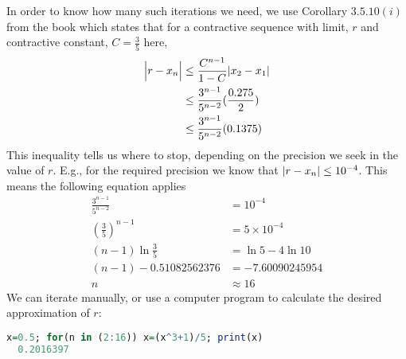 \documentclass[boxes, qed]{homework}
\DeclarePairedDelimiter\abs{\lvert}{\rvert}
\begin{document}
\begin{solution}
  In order to know how many such iterations we need, we use Corollary $3.5.10(i)$
  from the book which states that for a contractive sequence with limit, $r$ and
  contractive constant, $C=\frac{3}{5}$ here,
  \begin{align*}
    \abs[\Big]{r-x_n} 
      &\le \frac{C^{n-1}}{1-C} \abs[Big]{x_2-x_1}\\
      &\le \frac{3^{n-1}}{5^{n-2}} (\frac{0.275}{2})\\
      &\le \frac{3^{n-1}}{5^{n-2}} (0.1375)
  \end{align*}
  This inequality tells  us where to stop, depending on the precision we seek in the value
  of $r$. E.g., for the required precision we know that $\abs{r-x_n} \le 10^{-4}$. 
  This means the following equation applies
  \begin{align*}
    \frac{3^{n-1}}{5^{n-2}} &= 10^{-4}\\
    (\frac{3}{5})^{n-1} &= 5 \times 10^{-4}\\
    (n-1)\ln{\frac{3}{5}} &= \ln{5} -4 \ln{10}\\
    (n-1) -0.51082562376 &= -7.60090245954\\
    n &\approx 16
  \end{align*}
  We can iterate manually, or use a computer program to calculate 
  the desired approximation of $r$:
  \begin{lstlisting}[backgroundcolor = \color{lightgray},language = R]
  x=0.5; for(n in (2:16)) x=(x^3+1)/5; print(x)
  0.2016397
  \end{lstlisting}
\end{solution}
\end{document}
